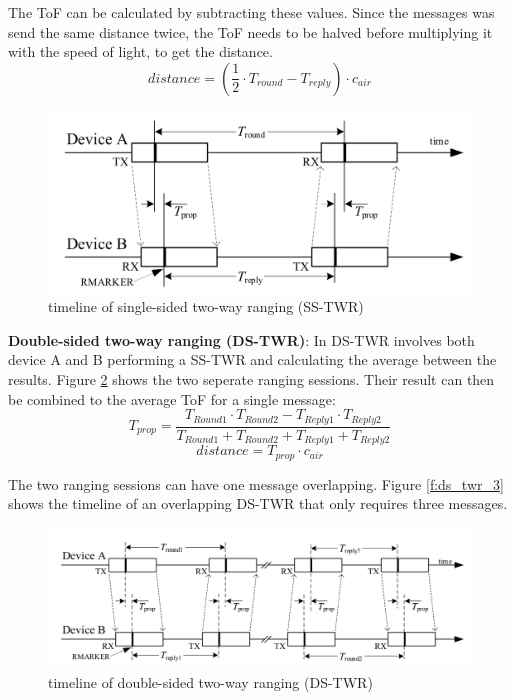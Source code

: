 The ToF can be calculated by subtracting these values.
Since the messages was send the same distance twice, the ToF needs to be halved before multiplying it with the speed of light, to get the distance.
\begin{equation}
	\mbox{$distance$} =
	\mbox{$(\frac{1}{2}\cdot T_{round}-T_{reply}) \cdot c_{air}$}
\end{equation}

\begin{figure}[ht!]
\centering
\includegraphics[width=\linewidth]{graphics/schematics/SingleSidedTwoWayRanging.png}
\caption{timeline of single-sided two-way ranging (SS-TWR)\cite{IEEE4z}}
\label{f:ss_twr}
\end{figure}

\textbf{Double-sided two-way ranging (DS-TWR)}:
In DS-TWR involves both device A and B performing a SS-TWR and calculating the average between the results.
Figure \ref{f:ds_twr} shows the two seperate ranging sessions.
Their result can then be combined to the average ToF for a single message:
\begin{equation}
	\mbox{$T_{prop}$} =
	\mbox{$\frac {T_{Round1}\cdot T_{Round2}-T_{Reply1}\cdot T_{Reply2}}{T_{Round1}+T_{Round2}+T_{Reply1}+T_{Reply2}}$}
\end{equation}
\begin{equation}
	\mbox{$distance$} =
	\mbox{$T_{prop} \cdot c_{air}$}
\end{equation}

The two ranging sessions can have one message overlapping.
Figure \ref{f:ds_twr_3} shows the timeline of an overlapping DS-TWR that only requires three messages.


\begin{figure}[ht!]
\centering
\includegraphics[width=\linewidth]{graphics/schematics/TwoSidedTwoWayRanging.PNG}
\caption{timeline of double-sided two-way ranging (DS-TWR)\cite{IEEE4z}}
\label{f:ds_twr}
\end{figure}

